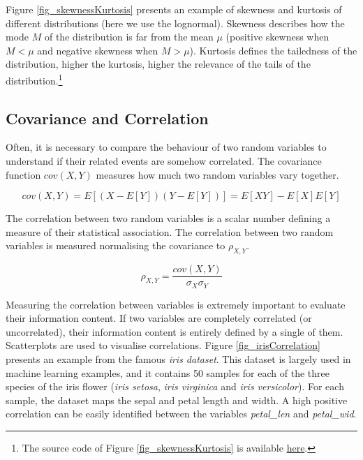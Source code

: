 Figure \ref{fig_skewnessKurtosis} presents an example of skewness and kurtosis of different distributions (here we use the lognormal). Skewness describes how the mode $M$ of the distribution is far from the mean $\mu$ (positive skewness when $M<\mu$ and negative skewness when $M>\mu$). Kurtosis defines the tailedness of the distribution, higher the kurtosis, higher the relevance of the tails of the distribution.\footnote{The source code of Figure \ref{fig_skewnessKurtosis} is available \href{https://github.com/aletuf93/logproj/blob/master/examples/01.\%20Probability\%20Theory.ipynb}{here}.
}

\subsection{Covariance and Correlation} \label{secCovarianceCorrelation}
Often, it is necessary to compare the behaviour of two random variables to understand if their related events are somehow correlated. The covariance function $cov(X,Y)$ measures how much two random variables vary together.

\begin{equation}
cov\left(X,Y\right)=E\left[\left(X-E\left[Y\right]\right)\left(Y-E\left[Y\right]\right)\right]=E\left[XY\right]-E[X]E[Y]
\label{eq_covariance}
\end{equation}

The correlation between two random variables is a scalar number defining a measure of their statistical association. The correlation between two random variables is measured normalising the covariance to $\rho_{X,Y}$.

\begin{equation}
\rho_{X,Y}=\frac{cov(X,Y)}{\sigma_X\sigma_Y}
\label{eq_correlation}
\end{equation}

Measuring the correlation between variables is extremely important to evaluate their information content. If two variables are completely correlated (or uncorrelated), their information content is entirely defined by a single of them. Scatterplots are used to visualise correlations. Figure \ref{fig_irisCorrelation} presents an example from the famous \textit{iris dataset}. This dataset is largely used in machine learning examples, and it contains 50 samples for each of the three species of the iris flower (\textit{iris setosa}, \textit{iris virginica} and \textit{iris versicolor}). For each sample, the dataset maps the sepal and petal length and width. A high positive correlation can be easily identified between the variables \textit{petal\_len} and \textit{petal\_wid}.

